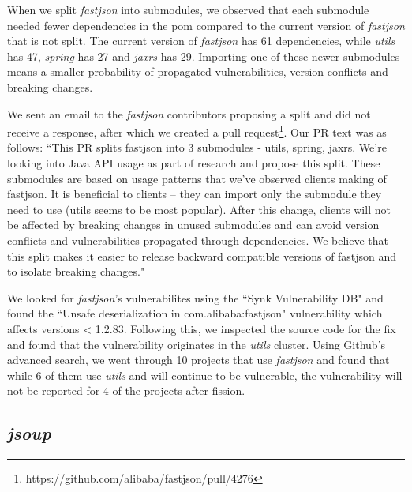 When we split \emph{fastjson} into submodules, we observed that each submodule needed fewer dependencies in the pom compared to the current version of \emph{fastjson} that is not split. The current version of \emph{fastjson} has 61 dependencies, while \emph{utils} has 47, \emph{spring} has 27 and \emph{jaxrs} has 29. Importing one of these newer submodules means a smaller probability of propagated vulnerabilities, version conflicts and breaking changes.

We sent an email to the \emph{fastjson} contributors proposing a split and did not receive a response, after which we created a pull request\footnote{\url{}https://github.com/alibaba/fastjson/pull/4276}. Our PR text was as follows:
``This PR splits fastjson into 3 submodules - utils, spring, jaxrs. We're looking into Java API usage as part of research and propose this split. These submodules are based on usage patterns that we've observed clients making of fastjson. It is beneficial to clients – they can import only the submodule they need to use (utils seems to be most popular). After this change, clients will not be affected by breaking changes in unused submodules and can avoid version conflicts and vulnerabilities propagated through dependencies. We believe that this split makes it easier to release backward compatible versions of fastjson and to isolate breaking changes."

We looked for \emph{fastjson}'s vulnerabilites using the ``Synk Vulnerability DB" and found the ``Unsafe deserialization in com.alibaba:fastjson" vulnerability which affects versions < 1.2.83. Following this, we inspected the source code for the fix and found that the vulnerability originates in the \emph{utils} cluster. Using Github's advanced search, we went through 10 projects that use \emph{fastjson} and found that while 6 of them use \emph{utils} and will continue to be vulnerable, the vulnerability will not be reported for 4 of the projects after fission.

\subsection{\emph{jsoup}}
\label{sec:jsoup-fission}

